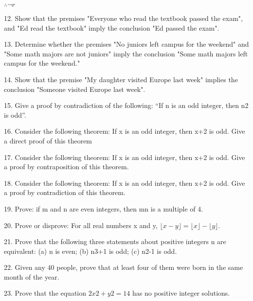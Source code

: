 \documentclass{article}
\begin{document}
$\therefore \lnot r$

12. Show that the premises "Everyone who read the textbook passed the exam", and "Ed read the textbook" imply the conclusion "Ed passed the exam".

13. Determine whether the premises "No juniors left campus for the weekend" and "Some math majors are not juniors" imply the conclusion "Some math majors left campus for the weekend."

14. Show that the premise "My daughter visited Europe last week" implies the conclusion "Someone visited Europe last week".

15. Give a proof by contradiction of the following: “If n is an odd integer, then n2 is odd”.

16. Consider the following theorem: If x is an odd integer, then x+2 is odd. Give a direct proof of this theorem

17. Consider the following theorem: If x is an odd integer, then x+2 is odd. Give a proof by contraposition of this theorem.

18. Consider the following theorem: If x is an odd integer, then x+2 is odd. Give a proof by contradiction of this theorem.

19. Prove: if m and n are even integers, then mn is a multiple of 4.

20. Prove or disprove: For all real numbers x and y, $\lfloor x-y\rfloor =\lfloor x \rfloor -\lfloor y \rfloor$.

21. Prove that the following three statements about positive integers n are equivalent: (a) n is even; (b) n3+1 is odd; (c) n2-1 is odd.

22. Given any 40 people, prove that at least four of them were born in the same month of the year.

23. Prove that the equation $2x2+y2=14$ has no positive integer solutions.
\end{document}
